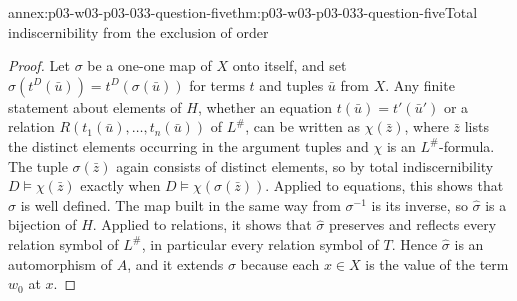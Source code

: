 \begin{annexitem}{annex:p03-w03-p03-033-question-five}{thm:p03-w03-p03-033-question-five}{Total indiscernibility from the exclusion of order}
\begin{proof}
Let \(\sigma\) be a one-one map of \(X\) onto itself, and set
\(\hat\sigma(t^D(\bar u))=t^D(\sigma(\bar u))\) for terms \(t\) and tuples
\(\bar u\) from \(X\). Any finite statement about elements of \(H\),
whether an equation \(t(\bar u)=t'(\bar u')\) or a relation
\(R(t_1(\bar u),\dots,t_n(\bar u))\) of \(L^\#\), can be written as
\(\chi(\bar z)\), where \(\bar z\) lists the distinct elements occurring
in the argument tuples and \(\chi\) is an \(L^\#\)-formula. The tuple
\(\sigma(\bar z)\) again consists of distinct elements, so by total
indiscernibility \(D\models\chi(\bar z)\) exactly when
\(D\models\chi(\sigma(\bar z))\). Applied to equations, this shows that
\(\hat\sigma\) is well defined. The map built in the same way from
\(\sigma^{-1}\) is its inverse, so \(\hat\sigma\) is a bijection of \(H\).
Applied to relations, it shows that \(\hat\sigma\) preserves and reflects
every relation symbol of \(L^\#\), in particular every relation symbol of
\(T\). Hence \(\hat\sigma\) is an automorphism of \(A\), and it extends
\(\sigma\) because each \(x\in X\) is the value of the term \(w_0\) at
\(x\).
\end{proof}
\end{annexitem}

